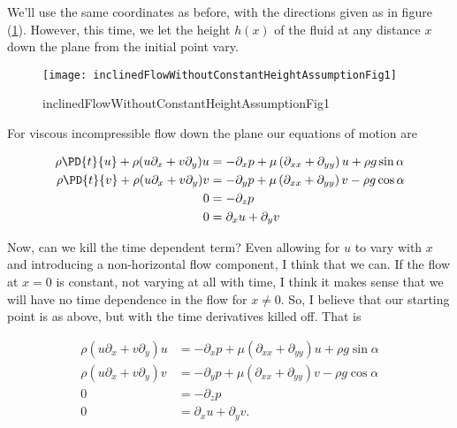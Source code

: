 We'll use the same coordinates as before, with the directions given as in figure (\ref{fig:inclinedFlowWithoutConstantHeightAssumption:inclinedFlowWithoutConstantHeightAssumptionFig1}).  However, this time, we let the height $h(x)$ of the fluid at any distance $x$ down the plane from the initial point vary.

\begin{figure}[htp]
   \centering
   \texttt{[image: inclinedFlowWithoutConstantHeightAssumptionFig1]}
   \caption{inclinedFlowWithoutConstantHeightAssumptionFig1}\label{fig:inclinedFlowWithoutConstantHeightAssumption:inclinedFlowWithoutConstantHeightAssumptionFig1}
\end{figure}

For viscous incompressible flow down the plane our equations of motion are

\begin{align}\label{eqn:inclinedFlowWithoutConstantHeightAssumption:n}
\rho \PD{t}{u} + \rho (u \partial_x + v \partial_y) u &= -\partial_x p + \mu \left(\partial_{xx} + \partial_{yy}\right) u + \rho g \sin\alpha \\
\rho \PD{t}{v} + \rho (u \partial_x + v \partial_y) v &= -\partial_y p + \mu \left(\partial_{xx} + \partial_{yy}\right) v - \rho g \cos\alpha \\
0 &= -\partial_z p \\
0 &= \partial_x u + \partial_y v
\end{align}

Now, can we kill the time dependent term?  Even allowing for $u$ to vary with $x$ and introducing a non-horizontal flow component, I think that we can.  If the flow at $x = 0$ is constant, not varying at all with time, I think it makes sense that we will have no time dependence in the flow for $x \ne 0$.  So, I believe that our starting point is as above, but with the time derivatives killed off.  That is

\begin{align}\label{eqn:inclinedFlowWithoutConstantHeightAssumption:n}
\rho (u \partial_x + v \partial_y) u &= -\partial_x p + \mu \left(\partial_{xx} + \partial_{yy}\right) u + \rho g \sin\alpha \\
\rho (u \partial_x + v \partial_y) v &= -\partial_y p + \mu \left(\partial_{xx} + \partial_{yy}\right) v - \rho g \cos\alpha \\
0 &= -\partial_z p \\
0 &= \partial_x u + \partial_y v.
\end{align}

